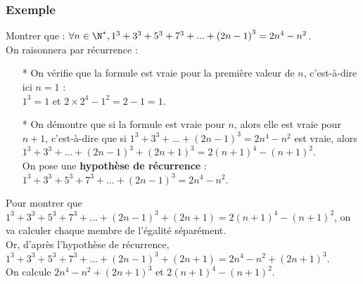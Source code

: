 \vspace*{-.6cm}

\subsubsection{Exemple }

Montrer que : $\forall n \in \N^*, 1^3 + 3^3 + 5^3 + 7^3 + ... + \left(2n - 1\right)^3 = 2n^4 - n^2$. \\ %

On raisonnera par récurrence : \\

\begin{itemize}

\item[*] On vérifie que la formule est vraie pour la première valeur de $n$, c'est-à-dire ici $n = 1$ :  \vspace{.3cm} \\ $1^3 = 1$ et $2 \times 2^4 - 1^2 = 2 - 1 = 1$. \\

\item[*] On démontre que si la formule est vraie pour $n$, alors elle est vraie pour $n+1$, c'est-à-dire que si $1^3 + 3^3 + ... + \left(2n-1\right)^3 = 2n^4 - n^2$ est vraie, alors $1^3 + 3^3 + ... + \left(2n-1\right)^3 + \left(2n+1\right)^3 = 2\left(n+1\right)^4 - \left(n+1\right)^2$. \vspace{.3cm} \\ On pose une \textbf{hypothèse de récurrence} : $1^3 + 3^3 + 5^3 + 7^3 + ... + \left(2n-1\right)^3 = 2n^4 - n^2$.
\end{itemize}

\vspace*{.3cm}

Pour montrer que $1^3 + 3^3 + 5^3 + 7^3 + ... + \left(2n-1\right)^3 + \left(2n+1\right) = 2\left(n+1\right)^4 - \left(n+1\right)^2$, on va calculer chaque membre de l'égalité séparément. \\

Or, d'après l'hypothèse de récurrence, $1^3 + 3^3 + 5^3 + 7^3 + ... + \left(2n-1\right)^3 + \left(2n+1\right) = 2n^4 - n^2 + \left(2n+1\right)^3$. \\

On calcule $2n^4 - n^2 + \left(2n+1\right)^3$ et $2\left(n+1\right)^4 - \left(n+1\right)^2$. \\

\vspace*{-5cm}

